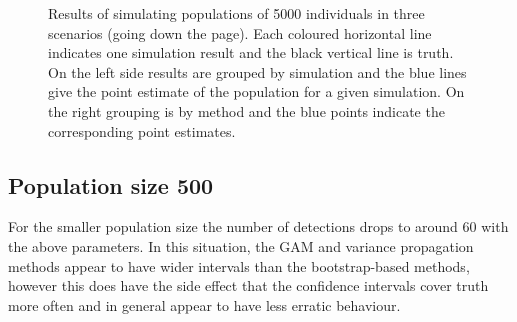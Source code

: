 \documentclass[11pt]{amsart}
\begin{document}
\begin{figure}
\begin{center}
\setlength{\tabcolsep}{0mm}
%
%
\caption{Results of simulating populations of 5000 individuals in three scenarios (going down the page). Each coloured horizontal line indicates one simulation result and the black vertical line is truth. On the left side results are grouped by simulation and the blue lines give the point estimate of the population for a given simulation. On the right grouping is by method and the blue points indicate the corresponding point estimates.}
\label{res-5000}
\end{center}
\end{figure}



\subsection{Population size 500}

For the smaller population size the number of detections drops to around 60 with the above parameters. In this situation, the GAM and variance propagation methods appear to have wider intervals than the bootstrap-based methods, however this does have the side effect that the confidence intervals cover truth more often and in general appear to have less erratic behaviour.
\end{document}

